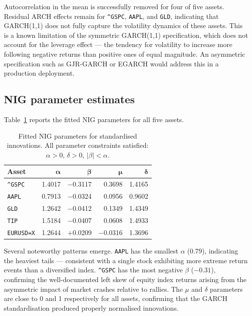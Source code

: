 \documentclass[12pt, a4paper]{article}
\begin{document}
Autocorrelation in the mean is successfully removed for four of 
five assets. Residual ARCH effects remain for \texttt{\^{}GSPC}, 
\texttt{AAPL}, and \texttt{GLD}, indicating that 
GARCH(1,1) does not fully capture the volatility dynamics of 
these assets. This is a known limitation of the symmetric 
GARCH(1,1) specification, which does not account for the leverage 
effect --- the tendency for volatility to increase more following 
negative returns than positive ones of equal magnitude. An 
asymmetric specification such as GJR-GARCH or EGARCH would address 
this in a production deployment.

\subsection{NIG parameter estimates}

Table~\ref{tab:nigparams} reports the fitted NIG parameters for 
all five assets.

\begin{table}[H]
\centering
\caption{Fitted NIG parameters for standardised innovations. 
All parameter constraints satisfied: $\alpha > 0$, $\delta > 0$, 
$|\beta| < \alpha$.}
\label{tab:nigparams}
\begin{tabular}{lrrrr}
\toprule
\textbf{Asset} & $\boldsymbol{\alpha}$ & $\boldsymbol{\beta}$ 
  & $\boldsymbol{\mu}$ & $\boldsymbol{\delta}$ \\
\midrule
\texttt{\^{}GSPC}   & 1.4017 & $-$0.3117 & 0.3698 & 1.4165 \\
\texttt{AAPL}       & 0.7913 & $-$0.0324 & 0.0956 & 0.9602 \\
\texttt{GLD}        & 1.2642 & $-$0.0412 & 0.1349 & 1.4349 \\
\texttt{TIP}        & 1.5184 & $-$0.0407 & 0.0608 & 1.4933 \\
\texttt{EURUSD=X}   & 1.2644 &  $+$0.0209 & $-$0.0316 & 1.3696 \\
\bottomrule
\end{tabular}
\end{table}

Several noteworthy patterns emerge. \texttt{AAPL} has the smallest 
$\alpha$ (0.79), indicating the heaviest tails --- consistent with 
a single stock exhibiting more extreme return events than a 
diversified index. \texttt{\^{}GSPC} has the most negative 
$\beta$ ($-0.31$), confirming the well-documented left skew of 
equity index returns arising from the asymmetric impact of market 
crashes relative to rallies. The $\mu$ and $\delta$ parameters 
are close to 0 and 1 respectively for all assets, confirming 
that the GARCH standardisation produced properly normalised 
innovations.
\end{document}
